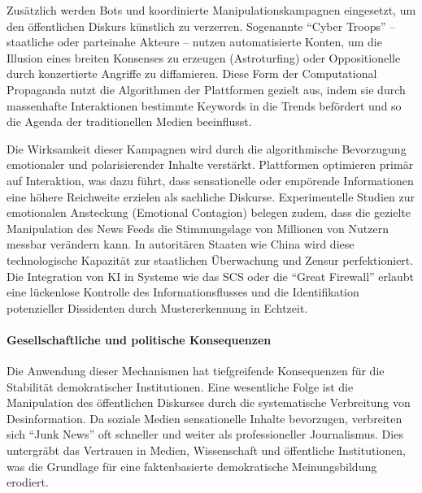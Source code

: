 Zusätzlich werden Bots und koordinierte Manipulationskampagnen eingesetzt, um den öffentlichen Diskurs künstlich zu verzerren. Sogenannte \enquote{Cyber Troops} -- staatliche oder parteinahe Akteure -- nutzen automatisierte Konten, um die Illusion eines breiten Konsenses zu erzeugen (Astroturfing) oder Oppositionelle durch konzertierte Angriffe zu diffamieren. Diese Form der Computational Propaganda nutzt die Algorithmen der Plattformen gezielt aus, indem sie durch massenhafte Interaktionen bestimmte Keywords in die Trends befördert und so die Agenda der traditionellen Medien beeinflusst.

Die Wirksamkeit dieser Kampagnen wird durch die algorithmische Bevorzugung emotionaler und polarisierender Inhalte verstärkt. Plattformen optimieren primär auf Interaktion, was dazu führt, dass sensationelle oder empörende Informationen eine höhere Reichweite erzielen als sachliche Diskurse. Experimentelle Studien zur emotionalen Ansteckung (Emotional Contagion) belegen zudem, dass die gezielte Manipulation des News Feeds die Stimmungslage von Millionen von Nutzern messbar verändern kann. In autoritären Staaten wie China wird diese technologische Kapazität zur staatlichen Überwachung und Zensur perfektioniert. Die Integration von \ac{KI} in Systeme wie das \ac{SCS} oder die \enquote{Great Firewall} erlaubt eine lückenlose Kontrolle des Informationsflusses und die Identifikation potenzieller Dissidenten durch Mustererkennung in Echtzeit.

\paragraph{Gesellschaftliche und politische Konsequenzen}

Die Anwendung dieser Mechanismen hat tiefgreifende Konsequenzen für die Stabilität demokratischer Institutionen. Eine wesentliche Folge ist die Manipulation des öffentlichen Diskurses durch die systematische Verbreitung von Desinformation. Da soziale Medien sensationelle Inhalte bevorzugen, verbreiten sich \enquote{Junk News} oft schneller und weiter als professioneller Journalismus. Dies untergräbt das Vertrauen in Medien, Wissenschaft und öffentliche Institutionen, was die Grundlage für eine faktenbasierte demokratische Meinungsbildung erodiert.

